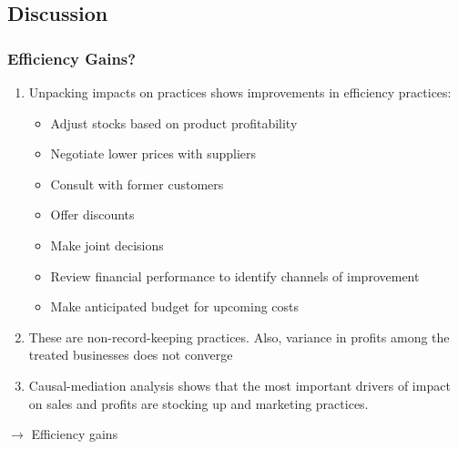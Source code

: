 \documentclass[hideothersubsections, usenames,dvipsnames,10pt]{beamer}
\begin{document}
\subsection{Discussion}
\begin{frame}
\frametitle{Efficiency Gains?}
\begin{enumerate}
\item Unpacking impacts on practices shows improvements in efficiency practices:
\vspace{0.1in}
\begin{itemize}
\item Adjust stocks based on product profitability
\item Negotiate lower prices with suppliers
\item Consult with former customers
\item Offer discounts
\item Make joint decisions
\item Review financial performance to identify channels of improvement
\item Make anticipated budget for upcoming costs
\end{itemize}
\vspace{0.2in}
\pause
\item These are non-record-keeping practices. Also, variance in profits among the treated businesses does not converge
\vspace{0.2in}
\pause
\item Causal-mediation analysis shows that the most important drivers of impact on sales and profits are stocking up and marketing practices.
\end{enumerate}
\vspace{0.2in}
$\rightarrow$ \textcolor[rgb]{0.00,0.07,1.00}{Efficiency gains}
\end{frame}
\end{document}
